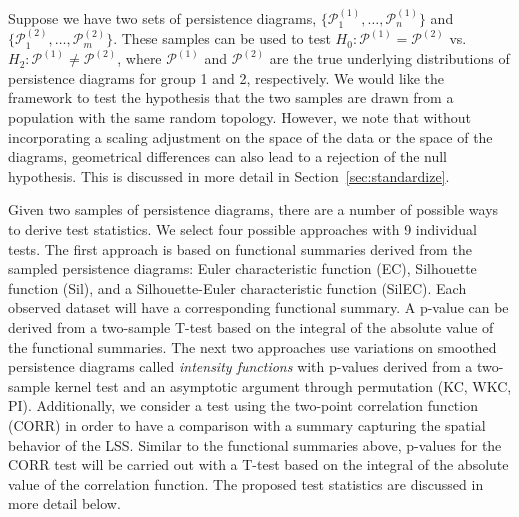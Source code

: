 \documentclass[12pt]{article}
\begin{document}
\begin{sloppypar}
Suppose we have two sets of persistence diagrams, $\{\mathcal 
P_1^{(1)}, \ldots, \mathcal P_n^{(1)}\}$ and $\{\mathcal P_1^{(2)}, \ldots, 
\mathcal P_m^{(2)}\}$.  These samples can be used to test $H_0: \mathcal 
P^{(1)} = \mathcal P^{(2)}$ vs. $H_2: \mathcal P^{(1)} \neq \mathcal P^{(2)}$, 
where $\mathcal P^{(1)}$ and $\mathcal P^{(2)}$ are the true underlying 
distributions of persistence diagrams for group 1 and 2, respectively. We would like the framework to test the hypothesis that the two samples are drawn from a population with the 
same random topology. However, we note that without incorporating a scaling adjustment on the space of the data or the space of the diagrams, geometrical differences can also 
lead to a rejection of the null hypothesis.  This is discussed in more detail in Section~\ref{sec:standardize}. 
\end{sloppypar}

Given two samples of persistence diagrams, there are a number of possible ways to derive test statistics.  We select four possible approaches with 9 individual tests. The first approach is based on functional summaries derived from the sampled persistence diagrams:  
Euler characteristic function (EC), Silhouette function (Sil), and a 
Silhouette-Euler characteristic function (SilEC).  Each observed dataset will 
have a corresponding functional summary.  A p-value can be derived from 
a two-sample T-test based on the integral of the absolute value of the 
functional summaries.  The next two approaches use variations on smoothed persistence diagrams called \emph{intensity functions} \cite{chen2015statistical} with p-values derived from a two-sample kernel test \cite{gretton2012kernel} and an asymptotic argument through permutation (KC, WKC, PI). Additionally, we consider a test using the two-point correlation function (CORR) in order to have a comparison with a summary capturing the spatial behavior of the LSS. Similar to the functional summaries above, p-values for the CORR test will be carried out with a T-test based on the integral of the absolute value of the correlation function. The proposed test statistics are discussed in more detail below.

\end{document}
